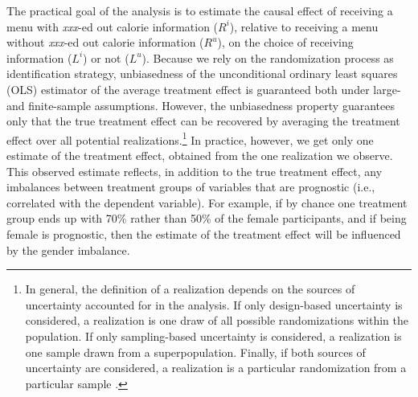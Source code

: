 The practical goal of the analysis is to estimate the causal effect of receiving a menu with \emph{xxx}-ed out calorie information ($R^i$), relative to receiving a menu without \emph{xxx}-ed out calorie information ($R^u$), on the choice of receiving information ($L^i$) or not ($L^u$). Because we rely on the randomization process as identification strategy, unbiasedness of the unconditional ordinary least squares (OLS) estimator of the average treatment effect is guaranteed both under large- and finite-sample assumptions. However, the unbiasedness property guarantees only that the true treatment effect can be recovered by averaging the treatment effect over all potential realizations.\footnote{In general, the definition of a realization depends on the sources of uncertainty accounted for in the analysis. If only design-based uncertainty is considered, a realization is one draw of all possible randomizations within the population. If only sampling-based uncertainty is considered, a realization is one sample drawn from a superpopulation. Finally, if both sources of uncertainty are considered, a realization is a particular randomization from a particular sample \citep{abadieSamplingBasedDesignBasedUncertainty2020}.} In practice, however, we get only one estimate of the treatment effect, obtained from the one realization we observe. This observed estimate reflects, in addition to the true treatment effect, any imbalances between treatment groups of variables that are prognostic (i.e., correlated with the dependent variable). For example, if by chance one treatment group ends up with 70\% rather than 50\% of the female participants, and if being female is prognostic, then the estimate of the treatment effect will be influenced by the gender imbalance.

